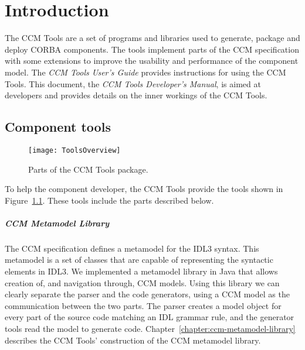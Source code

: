 \chapter{Introduction}
\label{chapter:introduction}

The CCM Tools are a set of programs and libraries used to generate, package and
deploy CORBA components. The tools implement parts of the CCM specification
\cite{CCMSpecification} with some extensions to improve the usability and
performance of the component model. The {\it CCM Tools User's Guide\/} provides
instructions for using the CCM Tools. This document, the {\it CCM Tools
Developer's Manual\/}, is aimed at developers and provides details on the inner
workings of the CCM Tools.

\section{Component tools}

\begin{figure}[!htb]
\centering \texttt{[image: ToolsOverview]}
\caption{Parts of the CCM Tools package.}
\label{fig:intro-ToolsOverview}
\end{figure}

To help the component developer, the CCM Tools provide the tools shown in
Figure~\ref{fig:intro-ToolsOverview}. These tools include the parts described
below.

\paragraph{CCM Metamodel Library}

The CCM specification defines a metamodel for the IDL3 syntax. This metamodel is
a set of classes that are capable of representing the syntactic elements in
IDL3. We implemented a metamodel library in Java that allows creation of, and
navigation through, CCM models. Using this library we can clearly separate the
parser and the code generators, using a CCM model as the communication between
the two parts. The parser creates a model object for every part of the source
code matching an IDL grammar rule, and the generator tools read the model to
generate code. Chapter~\ref{chapter:ccm-metamodel-library} describes the CCM
Tools' construction of the CCM metamodel library.

